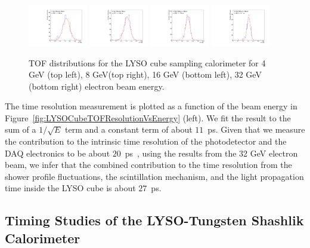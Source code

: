 \begin{figure}[h] \centering
\includegraphics[width=0.23\textwidth]{figs/TOF_Electron_LYSOCube_4GeV} 
\includegraphics[width=0.23\textwidth]{figs/TOF_Electron_LYSOCube_8GeV} 
\includegraphics[width=0.23\textwidth]{figs/TOF_Electron_LYSOCube_16GeV} 
\includegraphics[width=0.23\textwidth]{figs/TOF_Electron_LYSOCube_32GeV} 
\caption{ \small TOF distributions for the LYSO cube sampling calorimeter
for 4 GeV (top left), 8 GeV(top right), 16 GeV (bottom left),  32 GeV (bottom right) electron beam energy. } 
\label{fig:LYSOCubeTOF}
\end{figure}

The time resolution measurement is plotted as a function of the
beam energy in Figure~\ref{fig:LYSOCubeTOFResolutionVsEnergy} (left). We fit the result to the sum of a 
$1/\sqrt{E}$ term and a constant term of about $11$~ps.   Given that we measure the contribution 
to the intrinsic time resolution of the photodetector and the DAQ electronics to be about 
$20$~ps~\cite{MCPFastCaloNIMA}, using the results from the 32 GeV electron beam, we infer 
that the combined contribution to the time resolution from the shower profile
fluctuations, the scintillation mechanism, and the light propagation time inside the
LYSO cube is about $27$~ps.  

\subsection{Timing Studies of the LYSO-Tungsten Shashlik Calorimeter}
